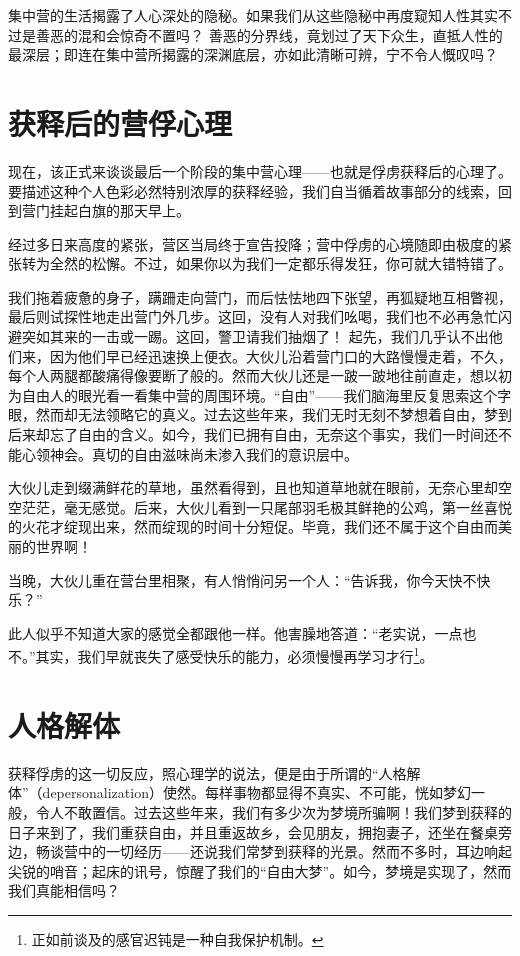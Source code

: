 \documentclass[11pt,oneside]{book}
\begin{document}
\begin{common-format}
集中营的生活揭露了人心深处的隐秘。如果我们从这些隐秘中再度窥知人性其实不过是善恶的混和会惊奇不置吗？ 善恶的分界线，竟划过了天下众生，直抵人性的最深层；即连在集中营所揭露的深渊底层，亦如此清晰可辨，宁不令人慨叹吗？


\section{获释后的营俘心理}
现在，该正式来谈谈最后一个阶段的集中营心理——也就是俘虏获释后的心理了。要描述这种个人色彩必然特别浓厚的获释经验，我们自当循着故事部分的线索，回到营门挂起白旗的那天早上。

经过多日来高度的紧张，营区当局终于宣告投降；营中俘虏的心境随即由极度的紧张转为全然的松懈。不过，如果你以为我们一定都乐得发狂，你可就大错特错了。

我们拖着疲惫的身子，蹒跚走向营门，而后怯怯地四下张望，再狐疑地互相瞥视，最后则试探性地走出营门外几步。这回，没有人对我们吆喝，我们也不必再急忙闪避突如其来的一击或一踢。这回，警卫请我们抽烟了！ 起先，我们几乎认不出他们来，因为他们早已经迅速换上便衣。大伙儿沿着营门口的大路慢慢走着，不久，每个人两腿都酸痛得像要断了般的。然而大伙儿还是一跛一跛地往前直走，想以初为自由人的眼光看一看集中营的周围环境。“自由”——我们脑海里反复思索这个字眼，然而却无法领略它的真义。过去这些年来，我们无时无刻不梦想着自由，梦到后来却忘了自由的含义。如今，我们已拥有自由，无奈这个事实，我们一时间还不能心领神会。真切的自由滋味尚未渗入我们的意识层中。

大伙儿走到缀满鲜花的草地，虽然看得到，且也知道草地就在眼前，无奈心里却空空茫茫，毫无感觉。后来，大伙儿看到一只尾部羽毛极其鲜艳的公鸡，第一丝喜悦的火花才绽现出来，然而绽现的时间十分短促。毕竟，我们还不属于这个自由而美丽的世界啊！

当晚，大伙儿重在营台里相聚，有人悄悄问另一个人：“告诉我，你今天快不快乐？”

此人似乎不知道大家的感觉全都跟他一样。他害臊地答道：“老实说，一点也不。”其实，我们早就丧失了感受快乐的能力，必须慢慢再学习才行\footnote{正如前谈及的感官迟钝是一种自我保护机制。}。


\section{人格解体}
获释俘虏的这一切反应，照心理学的说法，便是由于所谓的“人格解体”（depersonalization）使然。每样事物都显得不真实、不可能，恍如梦幻一般，令人不敢置信。过去这些年来，我们有多少次为梦境所骗啊！我们梦到获释的日子来到了，我们重获自由，并且重返故乡，会见朋友，拥抱妻子，还坐在餐桌旁边，畅谈营中的一切经历——还说我们常梦到获释的光景。然而不多时，耳边响起尖锐的哨音；起床的讯号，惊醒了我们的“自由大梦”。如今，梦境是实现了，然而我们真能相信吗？



\end{common-format}
\end{document}
